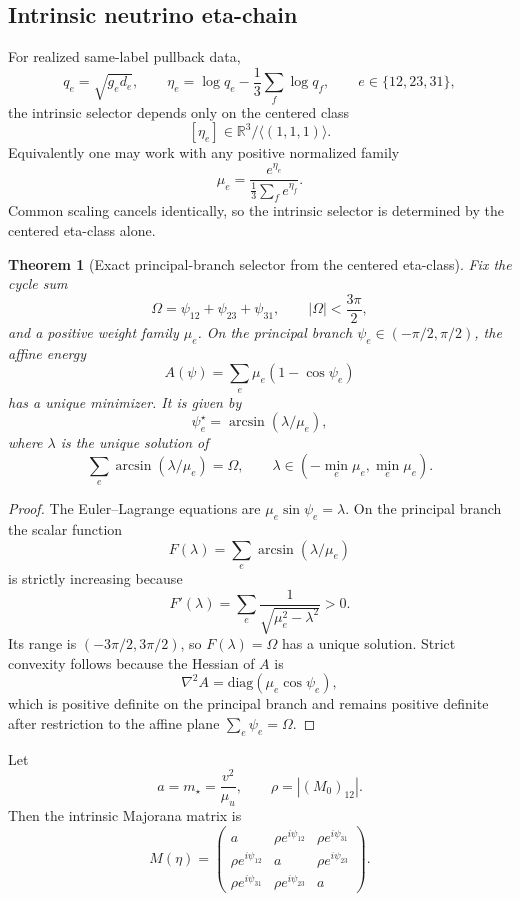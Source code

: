 \documentclass[11pt]{article}
\newtheorem{theorem}{Theorem}[section]
\begin{document}
\subsection{Intrinsic neutrino eta-chain}

For realized same-label pullback data,
\[
q_e=\sqrt{g_e d_e},
\qquad
\eta_e=\log q_e-\frac13\sum_f \log q_f,
\qquad
e\in\{12,23,31\},
\]
the intrinsic selector depends only on the centered class
\[
[\eta_e]\in \mathbb{R}^3/\langle(1,1,1)\rangle.
\]
Equivalently one may work with any positive normalized family
\[
\mu_e=\frac{e^{\eta_e}}{\frac13\sum_f e^{\eta_f}}.
\]
Common scaling cancels identically, so the intrinsic selector is determined by the centered
eta-class alone.

\begin{theorem}[Exact principal-branch selector from the centered eta-class]
Fix the cycle sum
\[
\Omega=\psi_{12}+\psi_{23}+\psi_{31},
\qquad |\Omega|<\frac{3\pi}{2},
\]
and a positive weight family \(\mu_e\). On the principal branch
\(\psi_e\in(-\pi/2,\pi/2)\), the affine energy
\[
A(\psi)=\sum_e \mu_e(1-\cos\psi_e)
\]
has a unique minimizer. It is given by
\[
\psi_e^\star=\arcsin(\lambda/\mu_e),
\]
where \(\lambda\) is the unique solution of
\[
\sum_e \arcsin(\lambda/\mu_e)=\Omega,
\qquad
\lambda\in(-\min_e\mu_e,\min_e\mu_e).
\]
\end{theorem}

\begin{proof}
The Euler--Lagrange equations are \(\mu_e\sin\psi_e=\lambda\). On the principal branch the scalar
function
\[
F(\lambda)=\sum_e\arcsin(\lambda/\mu_e)
\]
is strictly increasing because
\[
F'(\lambda)=\sum_e\frac{1}{\sqrt{\mu_e^2-\lambda^2}}>0.
\]
Its range is \(( -3\pi/2,3\pi/2)\), so \(F(\lambda)=\Omega\) has a unique solution. Strict
convexity follows because the Hessian of \(A\) is
\[
\nabla^2A=\mathrm{diag}(\mu_e\cos\psi_e),
\]
which is positive definite on the principal branch and remains positive definite after
restriction to the affine plane \(\sum_e\psi_e=\Omega\).
\end{proof}

Let
\[
a=m_\star=\frac{v^2}{\mu_u},
\qquad
\rho = |(M_0)_{12}|.
\]
Then the intrinsic Majorana matrix is
\[
M(\eta)=
\begin{pmatrix}
a & \rho e^{i\psi_{12}} & \rho e^{i\psi_{31}}\\
\rho e^{i\psi_{12}} & a & \rho e^{i\psi_{23}}\\
\rho e^{i\psi_{31}} & \rho e^{i\psi_{23}} & a
\end{pmatrix}.
\]
\end{document}
